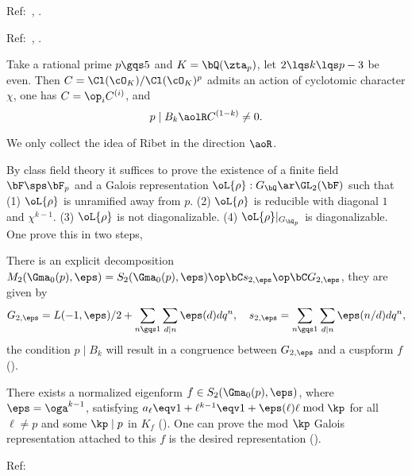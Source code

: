 \documentclass[article, a4paper, twoside]{universal}
\begin{document}
\confighead{}{}{}



\begin{cmt}[0]

Ref:~\cite{Ribet1976Modular,Wiles1980,MW1984}, \cite{Wiles1990Iwasawa}.

Ref:~\cite{Washington1997}, \cite{Rubin1991}.


\begin{thm}
	Take a rational prime $p\gqs5$ and $K=\bQ(\zta_{p})$, let $2\lqs k\lqs p-3$ be even.
	Then $C=\Cl(\cO_{K})/\Cl(\cO_{K})^{p}$ admits an action of cyclotomic character $\chi$, one has $C=\op_{i}C^{(i)}$, and
	\[
		p\mid B_{k}\aolR C^{(1-k)}\neq0.
	\]
\end{thm}

\begin{prf}
	We only collect the idea of Ribet in the direction $\aoR$.

	By class field theory it suffices to prove the existence of a finite field $\bF\sps\bF_{p}$ and a Galois representation $\oL{\rho}:G_{\bQ}\ar\GL_{2}(\bF)$ such that (1) $\oL{\rho}$ is unramified away from $p$. (2) $\oL{\rho}$ is reducible with diagonal $1$ and $\chi^{k-1}$. (3) $\oL{\rho}$ is not diagonalizable. (4) $\oL{\rho}|_{G_{\bQ_{p}}}$ is diagonalizable. One prove this in two steps,

	 There is an explicit decomposition $M_{2}(\Gma_{0}(p),\eps)=S_{2}(\Gma_{0}(p),\eps)\op\bC s_{2,\eps}\op\bC G_{2,\eps}$, they are given by
	\[
		G_{2,\eps}=L(-1,\eps)/2+\sum_{n\gqs1}\sum_{d\mid n}\eps(d)dq^{n},\quad s_{2,\eps}=\sum_{n\gqs1}\sum_{d\mid n}\eps(n/d)dq^{n},
	\]
	the condition $p\mid B_{k}$ will result in a congruence between $G_{2,\eps}$ and a cuspform $f$ (\cite[3.4, 3.5]{Ribet1976Modular}).

	There exists a normalized eigenform $f\in S_{2}(\Gma_{0}(p),\eps)$, where $\eps=\oga^{k-1}$, satisfying $a_{\ell}\eqv1+\ell^{k-1}\eqv1+\eps(\ell)\ell\bmod{\kp}$ for all $\ell\neq p$ and some $\kp\mid p$ in $K_{f}$ (\cite[3.7]{Ribet1976Modular}). One can prove the mod $\kp$ Galois representation attached to this $f$ is the desired representation (\cite[4.2, 4.3, 4.4]{Ribet1976Modular}).
\end{prf}


\end{cmt}

Ref:~\cite{MW1984}
\end{document}
